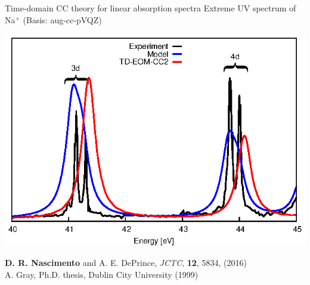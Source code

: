 \documentclass{beamer}
\begin{document}
\begin{frame}{Time-domain CC theory for linear absorption spectra}
 Extreme UV spectrum of Na$^+$ (Basis: aug-cc-pVQZ)
 \begin{center}
      \includegraphics[scale=1.0]{figures/anim_Na_3.eps}
 \end{center}
 \footnotesize{{\bf D. R. Nascimento} and A. E. DePrince, {\it JCTC}, {\bf 12}, 5834, (2016) }\\
 \footnotesize{A. Gray, Ph.D. thesis, Dublin City University (1999)} 
\end{frame}
\end{document}
